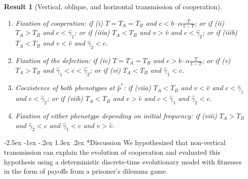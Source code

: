\documentclass[12pt]{extarticle}
\makeatletter
\renewcommand\section{\@startsection {section}{1}{\z@}%
     {-2.5ex \@plus -1ex \@minus -.2ex}%
     {1.3ex \@plus.2ex}%
    {\Large\bfseries}}
\newtheorem{result}{Result}
\makeatother
\begin{document}
{\begin{result}[Vertical, oblique, and horizontal transmission of cooperation]
\begin{enumerate}
\item \emph{Fixation of cooperation}: 
	if \emph{(i)} $T=T_A=T_B$ and $c < b\cdot \alpha \frac{T}{1-T}$; or
	if \emph{(ii)} $T_A>T_B$ and $c < \hat\gamma_1$; or 
	if \emph{(iiia)} $T_A<T_B$ and $v>\hat v$ and $c < \hat\gamma_2$; or
	if \emph{(iiib)} $T_A<T_B$ and $v<\hat v$ and $\hat\gamma_2 < c$.
\item \emph{Fixation of the defection}: 
	if \emph{(iv)}  $T=T_A=T_B$ and $c > b\cdot \alpha \frac{T}{1-T}$; or 
  if \emph{(v)} $T_A>T_B$ and $\hat\gamma_1 < c < \hat\gamma_2$; or 
	if \emph{(vi)} $T_A<T_B$ and $\hat\gamma_1 < c$.
\item \emph{Coexistence of both phenotypes at $\hat{p}^*$}: 
  if \emph{(viia)} $T_A < T_B$ and $v<\hat{v}$ and $c<\hat\gamma_1$ and $c<\hat\gamma_2$; or
  if \emph{(viib)} $T_A < T_B$ and $v>\hat{v}$ and $c<\hat\gamma_1$ and $\hat\gamma_2 < c$. %
\item \emph{Fixation of either phenotype depending on initial frequency}:
  if \emph{(viii)}  $T_A>T_B$ and $\hat\gamma_2 < c$ and $\hat\gamma_1 < c$ and $v>\hat{v}$.
\end{enumerate}

\end{result}




\section*{Discussion}
We hypothesized that non-vertical transmission can explain the evolution of cooperation and evaluated this hypothesis using a deterministic discrete-time evolutionary model with fitnesses in the form of payoffs from a prisoner's dilemma game.

}
\end{document}
